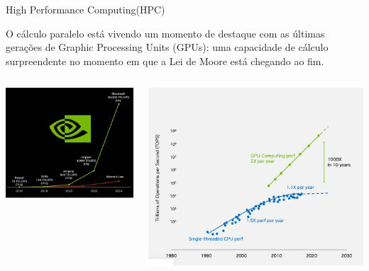 \documentclass{beamer}
\begin{document}
	\begin{frame}{High Performance Computing(HPC)}
		
		\scriptsize
		O cálculo paralelo está vivendo um momento de destaque com as últimas gerações de Graphic Processing Units (GPUs): uma capacidade de cálculo surpreendente no momento em que a Lei de Moore está chegando ao fim.
		
		\vspace{0.3cm}
		
		\begin{columns}[T] 
			\includegraphics[scale=0.2]{Nvidia.png}
			
			\includegraphics[scale=0.14]{Moore_vs_GPU.png}
		\end{columns}
		

\end{frame}
\end{document}
